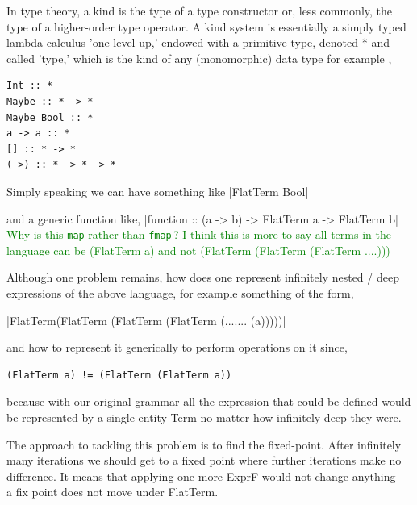 \documentclass[thesis-solanki.tex]{subfiles}
\begin{document}
In type theory, a kind is the type of a type constructor or, less commonly, the type of a higher-order type operator. A kind system is
essentially a simply typed lambda calculus 'one level up,' endowed with a primitive type, denoted * and called 'type,' which is the kind of
any (monomorphic) data type for example \cite{website:kindhaskellwiki},

\begin{verbatim}
Int :: *
Maybe :: * -> *
Maybe Bool :: *
a -> a :: *
[] :: * -> *
(->) :: * -> * -> *
\end{verbatim}

Simply speaking we can have something like
|FlatTerm Bool|

and a generic function like,
|function :: (a -> b) -> FlatTerm a -> FlatTerm b|
\textcolor{green}{%
  Why is this {\color{blue}\Verb|map|} rather than {\color{blue}\Verb|fmap|}\,?
  I think this is more to say all terms in the language can be (FlatTerm a) and not (FlatTerm (FlatTerm (FlatTerm ....)))
}

Although one problem remains, how does one represent infinitely nested / deep expressions of the above language, for example something of
the form,

|FlatTerm(FlatTerm (FlatTerm (FlatTerm (....... (a)))))|

and how to represent it generically to perform operations on it since,
\begin{verbatim}
(FlatTerm a) != (FlatTerm (FlatTerm a))
\end{verbatim}
%
because with our original grammar all the expression that could be defined would be represented by a single entity Term no matter how
infinitely deep they were.

The approach to tackling this problem is to find the fixed-point.
After infinitely many iterations we should get to a fixed point where further iterations make no
difference.
It means that applying one more ExprF would not change anything – a fix point does not move under FlatTerm.
\end{document}
